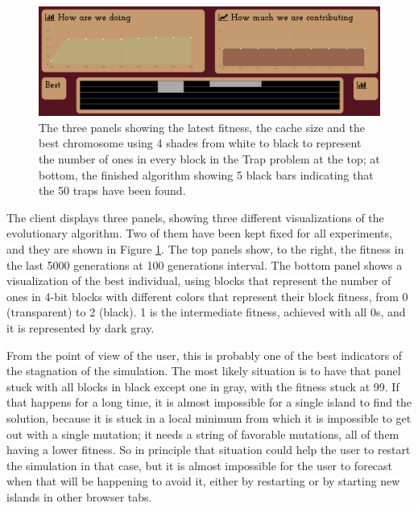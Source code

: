 \documentclass{sig-alternate}
\begin{document}
%
%
 
\begin{figure}[!htb]
\centering
\includegraphics[width=0.9\linewidth]{all.png}
\caption{The three panels showing the latest fitness, the cache size
  and the best chromosome using 4 shades from white to black to
  represent the number of ones in every block in the Trap
  problem at the top; at bottom, the finished algorithm showing 5
  black bars indicating that the 50 traps have been found. \label{fig:all}}
\end{figure}
%
The client displays three panels, showing three different
visualizations of the evolutionary algorithm. Two of them have been
kept fixed for all experiments, and they are shown in Figure
\ref{fig:all}. The top panels show, to the right, the fitness in the
last 5000 generations at 100 generations interval. The bottom panel
shows a visualization of the best individual, using blocks that
represent the number of ones in 4-bit blocks with different colors
that represent their block fitness, from 0 (transparent) to 2
(black). 1 is the intermediate fitness, achieved with all 0s, and it
is represented by dark gray. 

From the point of view of the user, this is probably one of the best
indicators of the stagnation of the simulation. The most likely
situation is to have that panel stuck with all blocks in black except
one in gray, with the fitness stuck at 99. If that happens for a long
time, it is almost impossible for a single island to find the
solution, because it is stuck in a local minimum from which it is
impossible to get out with a single mutation; it needs a string of
favorable mutations, all of them having a lower fitness. So in
principle that situation could help the user to restart the simulation
in that case, but it is almost impossible for the user to forecast
when that will be happening to avoid it, either by restarting or by
starting new islands in other browser tabs. 
\end{document}
